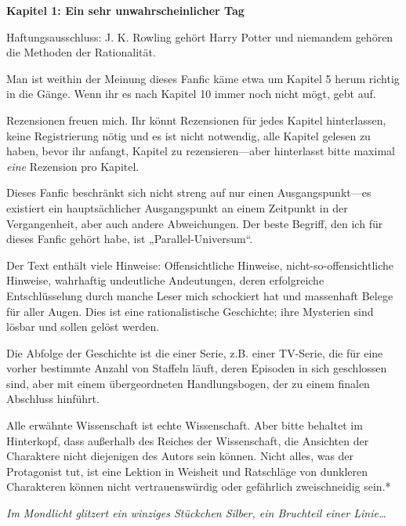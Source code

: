 

\hypertarget{ein-sehr-unwahrscheinlicher-tag}{%

\textbf{Kapitel 1: Ein sehr unwahrscheinlicher Tag}

Haftungsausschluss: J. K. Rowling gehört Harry Potter und niemandem gehören die Methoden der Rationalität.

Man ist weithin der Meinung dieses Fanfic käme etwa um Kapitel 5 herum richtig in die Gänge. Wenn ihr es nach Kapitel 10 immer noch nicht mögt, gebt auf.

Rezensionen freuen mich. Ihr könnt Rezensionen für jedes Kapitel hinterlassen, keine Registrierung nötig und es ist nicht notwendig, alle Kapitel gelesen zu haben, bevor ihr anfangt, Kapitel zu rezensieren—aber hinterlasst bitte maximal \emph{eine} Rezension pro Kapitel.

Dieses Fanfic beschränkt sich nicht streng auf nur einen Ausgangspunkt—es existiert ein hauptsächlicher Ausgangspunkt an einem Zeitpunkt in der Vergangenheit, aber auch andere Abweichungen. Der beste Begriff, den ich für dieses Fanfic gehört habe, ist „Parallel-Universum“.

Der Text enthält viele Hinweise: Offensichtliche Hinweise, nicht-so-offensichtliche Hinweise, wahrhaftig undeutliche Andeutungen, deren erfolgreiche Entschlüsselung durch manche Leser mich schockiert hat und massenhaft Belege für aller Augen. Dies ist eine rationalistische Geschichte; ihre Mysterien sind lösbar und sollen gelöst werden.

Die Abfolge der Geschichte ist die einer Serie, z.B. einer TV-Serie, die für eine vorher bestimmte Anzahl von Staffeln läuft, deren Episoden in sich geschlossen sind, aber mit einem übergeordneten Handlungsbogen, der zu einem finalen Abschluss hinführt.

Alle erwähnte Wissenschaft ist echte Wissenschaft. Aber bitte behaltet im Hinterkopf, dass außerhalb des Reiches der Wissenschaft, die Ansichten der Charaktere nicht diejenigen des Autors sein können. Nicht alles, was der Protagonist tut, ist eine Lektion in Weisheit und Ratschläge von dunkleren Charakteren können nicht vertrauenswürdig oder gefährlich zweischneidig sein.*

\later

\emph{Im Mondlicht glitzert ein winziges Stückchen Silber, ein Bruchteil einer Linie…}

}
